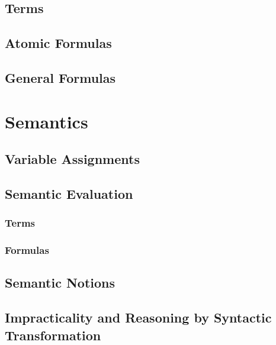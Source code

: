\documentclass[a4paper, 11pt, accentcolor = tud3b]{tudreport}
\begin{document}
			\subsection{Terms} %

			\subsection{Atomic Formulas} %

			\subsection{General Formulas} %

		\section{Semantics} %

			\subsection{Variable Assignments} %

			\subsection{Semantic Evaluation} %

				\subsubsection{Terms} %

				\subsubsection{Formulas} %

			\subsection{Semantic Notions} %

			\subsection{Impracticality and Reasoning by Syntactic Transformation} %
\end{document}
